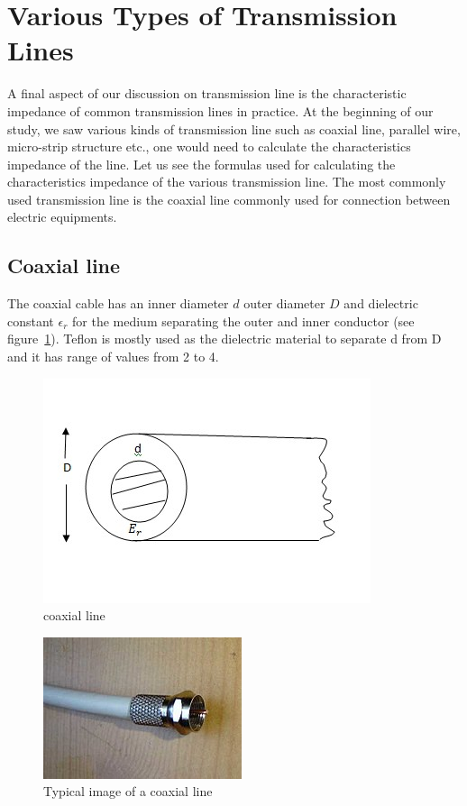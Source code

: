\section{Various Types of Transmission Lines}\label{lec:lec15}
A final aspect of our discussion on transmission line is the characteristic impedance of common transmission lines in practice. At the beginning of our study, we saw various kinds of transmission line such as coaxial line, parallel wire, micro-strip structure etc., one would need to calculate the characteristics impedance of the line. Let us see the formulas used for calculating the characteristics impedance of the various transmission line. The most commonly used transmission line is the coaxial line commonly used for connection between electric equipments.

\subsection{Coaxial line}
The coaxial cable has an inner diameter $d$ outer diameter $D$ and dielectric constant $\epsilon_r$ for the medium separating the outer and inner conductor (see figure~\ref{fig:coaxialcable1}). Teflon is mostly used as the dielectric material to separate d from D and it has range of values from 2 to 4.
\begin{figure}[h]
\centering
\includegraphics[width=1\linewidth]{./graphics/coaxialcable1}
\caption{coaxial line}
\label{fig:coaxialcable1}
\end{figure}
\begin{figure}[h]
\centering
\includegraphics[scale=0.8]{./graphics/coaxialcable}
\caption{Typical image of a coaxial line}
\end{figure}

